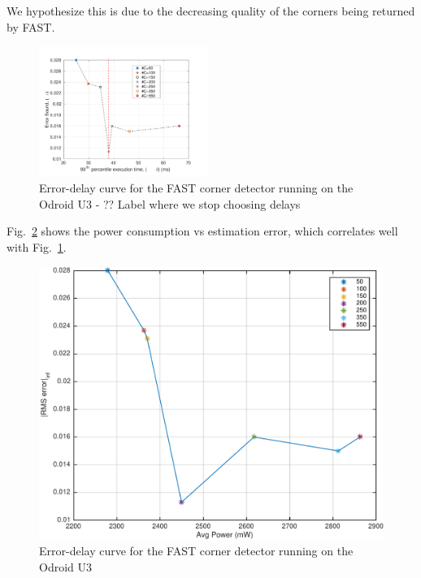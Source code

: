We hypothesize this is due to the decreasing quality of the corners being returned by FAST.
\begin{figure}[t]
\centering
\includegraphics[width=0.49\textwidth]{figures/errVsTime}
\caption{Error-delay curve for the FAST corner detector running on the Odroid U3 - ?? Label where we stop choosing delays}
\label{fig:fast}
\end{figure}

Fig.~\ref{fig:fastErrVsPower} shows the power consumption vs estimation error, which correlates well with Fig.~\ref{fig:fast}.
\begin{figure}[t]
	\centering
	\includegraphics[width=0.7\linewidth]{figures/errVsPower}
	\caption{Error-delay curve for the FAST corner detector running on the Odroid U3}
	\label{fig:fastErrVsPower}
\end{figure}